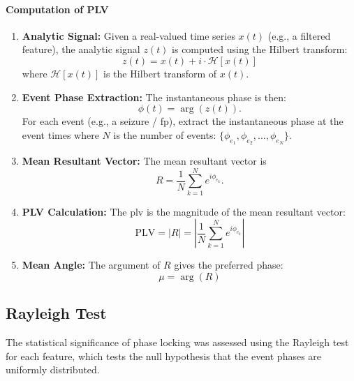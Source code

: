 \paragraph{Computation of PLV}
\begin{enumerate}
    \item \textbf{Analytic Signal:} Given a real-valued time series $x(t)$ (e.g., a filtered feature), the analytic signal $z(t)$ is computed using the Hilbert transform:
    \begin{equation} \label{eq:analytic-signal}
        z(t) = x(t) + i \cdot \mathcal{H}[x(t)]
    \end{equation}
    where $\mathcal{H}[x(t)]$ is the Hilbert transform of $x(t)$.

    \item \textbf{Event Phase Extraction:}
    The instantaneous phase is then:
    \begin{equation} \label{eq:instantaneous-phase}
        \phi(t) = \arg(z(t)).
    \end{equation}
    For each event (e.g., a seizure / \gls{fp}), extract the instantaneous phase at the event times where $N$ is the number of events: $\{\phi_{e_1}, \phi_{e_2}, \ldots, \phi_{e_N}\}$.

    \item \textbf{Mean Resultant Vector:} The mean resultant vector is
    \begin{equation} \label{eq:mean-resultant-vector}
        R = \frac{1}{N} \sum_{k=1}^N e^{i \phi_{e_k}}.
    \end{equation}

    \item \textbf{PLV Calculation:} The \gls{plv} is the magnitude of the mean resultant vector:
    \begin{equation} \label{eq:plv}
        \mathrm{PLV} = |R| = \left| \frac{1}{N} \sum_{k=1}^N e^{i \phi_{e_k}} \right|
    \end{equation}

    \item \textbf{Mean Angle:} The argument of $R$ gives the preferred phase:
    \begin{equation} \label{eq:plv-mean-angle}
        \mu = \arg(R)
    \end{equation}
\end{enumerate}

\subsection{Rayleigh Test} \label{subsec:rayleigh}
The statistical significance of phase locking was assessed using the Rayleigh test for each feature, which tests the null hypothesis that the event phases are uniformly distributed.

